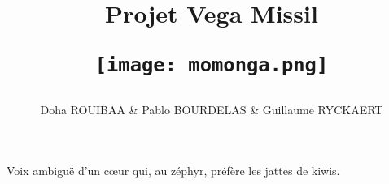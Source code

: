\documentclass{report}
\begin{document}
\title{%
    \begin{minipage}\linewidth
        \centering
        Projet Vega Missil
        \vskip 3pt
        \author{ Doha ROUIBAA & Pablo BOURDELAS & Guillaume RYCKAERT }
    \end{minipage}
    \begin{figure}[ht!]
        \centering
        \texttt{[image: momonga.png]}
    \end{figure}
}
\maketitle




Voix ambiguë d'un cœur qui, au zéphyr, préfère les jattes de kiwis.
\end{document}
